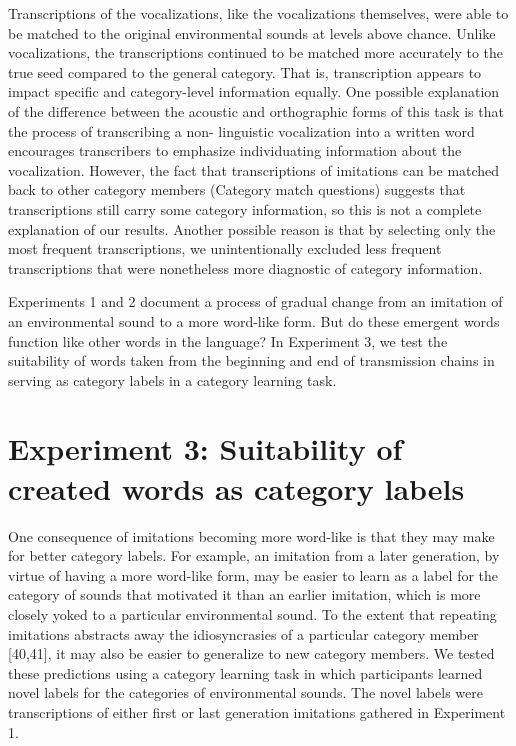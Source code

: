 \documentclass[english,floatsintext,man]{apa6}
\theoremstyle{definition}
\theoremstyle{definition}
\theoremstyle{definition}
\theoremstyle{remark}
\begin{document}
Transcriptions of the vocalizations, like the vocalizations themselves,
were able to be matched to the original environmental sounds at levels
above chance. Unlike vocalizations, the transcriptions continued to be
matched more accurately to the true seed compared to the general
category. That is, transcription appears to impact specific and
category-level information equally. One possible explanation of the
difference between the acoustic and orthographic forms of this task is
that the process of transcribing a non- linguistic vocalization into a
written word encourages transcribers to emphasize individuating
information about the vocalization. However, the fact that
transcriptions of imitations can be matched back to other category
members (Category match questions) suggests that transcriptions still
carry some category information, so this is not a complete explanation
of our results. Another possible reason is that by selecting only the
most frequent transcriptions, we unintentionally excluded less frequent
transcriptions that were nonetheless more diagnostic of category
information.

Experiments 1 and 2 document a process of gradual change from an
imitation of an environmental sound to a more word-like form. But do
these emergent words function like other words in the language? In
Experiment 3, we test the suitability of words taken from the beginning
and end of transmission chains in serving as category labels in a
category learning task.

\hypertarget{experiment-3-suitability-of-created-words-as-category-labels}{%
\section{Experiment 3: Suitability of created words as category
labels}\label{experiment-3-suitability-of-created-words-as-category-labels}}

One consequence of imitations becoming more word-like is that they may
make for better category labels. For example, an imitation from a later
generation, by virtue of having a more word-like form, may be easier to
learn as a label for the category of sounds that motivated it than an
earlier imitation, which is more closely yoked to a particular
environmental sound. To the extent that repeating imitations abstracts
away the idiosyncrasies of a particular category member {[}40,41{]}, it
may also be easier to generalize to new category members. We tested
these predictions using a category learning task in which participants
learned novel labels for the categories of environmental sounds. The
novel labels were transcriptions of either first or last generation
imitations gathered in Experiment 1.
\end{document}
